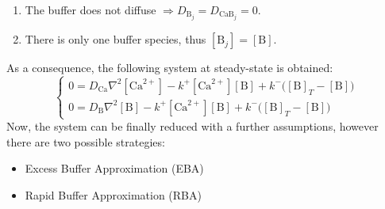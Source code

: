 \begin{enumerate}
    \item The buffer does not diffuse \(\Rightarrow{D_{\text{B}_{j}}=D_{\text{CaB}_{j}}=0}\).
    \item There is only one buffer species, thus \([\text{B}_{j}]=[\text{B}]\).
\end{enumerate}
As a consequence, the following system at steady-state is obtained:
\begin{equation*}
    \begin{cases}
        0=D_{\text{Ca}}\nabla^{2}[\text{Ca}^{2+}]-k^{+}[\text{Ca}^{2+}][\text{B}]+k^{-}\bigl([\text{B}]_{T}-[\text{B}]\bigr) \\
        0=D_{\text{B}}\nabla^{2}[\text{B}]-k^{+}[\text{Ca}^{2+}][\text{B}]+k^{-}\bigl([\text{B}]_{T}-[\text{B}]\bigr)
    \end{cases}
\end{equation*}
Now, the system can be finally reduced with a further assumptions, however there are two possible strategies:
\begin{itemize}
    \item Excess Buffer Approximation (EBA)
    \item Rapid Buffer Approximation (RBA)
\end{itemize}
